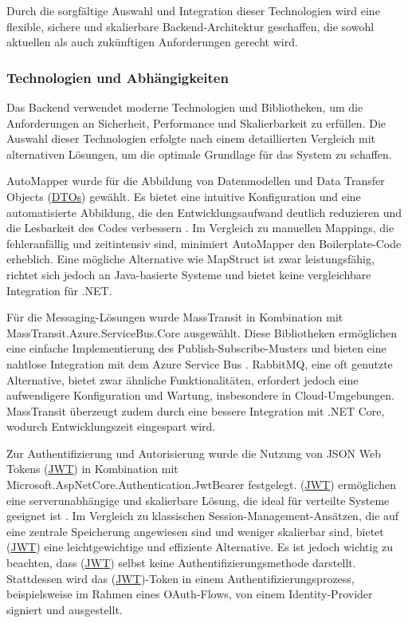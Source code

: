Durch die sorgfältige Auswahl und Integration dieser Technologien wird eine flexible, sichere und skalierbare Backend-Architektur geschaffen, die sowohl aktuellen als auch zukünftigen Anforderungen gerecht wird.



\subsubsection*{Technologien und Abhängigkeiten} Das Backend verwendet moderne Technologien und Bibliotheken, um die Anforderungen an Sicherheit, Performance und Skalierbarkeit zu erfüllen. Die Auswahl dieser Technologien erfolgte nach einem detaillierten Vergleich mit alternativen Lösungen, um die optimale Grundlage für das System zu schaffen.

AutoMapper wurde für die Abbildung von Datenmodellen und Data Transfer Objects (\hyperref[abkuerzungen]{DTOs}) gewählt. Es bietet eine intuitive Konfiguration und eine automatisierte Abbildung, die den Entwicklungsaufwand deutlich reduzieren und die Lesbarkeit des Codes verbessern \cite{automapperDocs}. Im Vergleich zu manuellen Mappings, die fehleranfällig und zeitintensiv sind, minimiert AutoMapper den Boilerplate-Code erheblich. Eine mögliche Alternative wie MapStruct ist zwar leistungsfähig, richtet sich jedoch an Java-basierte Systeme und bietet keine vergleichbare Integration für .NET.

Für die Messaging-Lösungen wurde MassTransit in Kombination mit \\MassTransit.Azure.ServiceBus.Core ausgewählt. Diese Bibliotheken ermöglichen eine einfache Implementierung des Publish-Subscribe-Musters und bieten eine nahtlose Integration mit dem Azure Service Bus \cite{masstransit2021}. RabbitMQ, eine oft genutzte Alternative, bietet zwar ähnliche Funktionalitäten, erfordert jedoch eine aufwendigere Konfiguration und Wartung, insbesondere in Cloud-Umgebungen. MassTransit überzeugt zudem durch eine bessere Integration mit .NET Core, wodurch Entwicklungszeit eingespart wird.

Zur Authentifizierung und Autorisierung wurde die Nutzung von JSON Web Tokens (\hyperref[abkuerzungen]{JWT}) in Kombination mit Microsoft.AspNetCore.Authentication.JwtBearer festgelegt. (\hyperref[abkuerzungen]{JWT}) ermöglichen eine serverunabhängige und skalierbare Lösung, die ideal für verteilte Systeme geeignet ist \cite{jwtAuthDocs}. Im Vergleich zu klassischen Session-Management-Ansätzen, die auf eine zentrale Speicherung angewiesen sind und weniger skalierbar sind, bietet (\hyperref[abkuerzungen]{JWT}) eine leichtgewichtige und effiziente Alternative. Es ist jedoch wichtig zu beachten, dass (\hyperref[abkuerzungen]{JWT}) selbst keine Authentifizierungsmethode darstellt. Stattdessen wird das (\hyperref[abkuerzungen]{JWT})-Token in einem Authentifizierungsprozess, beispielsweise im Rahmen eines OAuth-Flows, von einem Identity-Provider signiert und ausgestellt.

